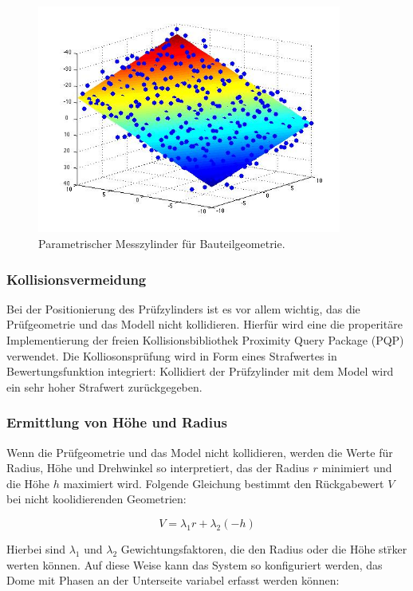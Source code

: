\begin{figure}[ht]
\centering
\includegraphics[width=10cm]{graphics/planefit.jpg}
\caption{Parametrischer Messzylinder f\"ur Bauteilgeometrie.}
\label{im:messlehre}
\end{figure}

\subsubsection{Kollisionsvermeidung}

Bei der Positionierung des Pr\"ufzylinders ist es vor allem wichtig, das die Pr\"ufgeometrie und das Modell nicht kollidieren. Hierf\"ur wird eine die properit\"are Implementierung der freien Kollisionsbibliothek Proximity Query Package (PQP) verwendet. Die Kolliosonspr\"ufung wird in Form eines Strafwertes in Bewertungsfunktion integriert: Kollidiert der Pr\"ufzylinder mit dem Model wird ein sehr hoher Strafwert zur\"uckgegeben.

\subsubsection{Ermittlung von H\"ohe und Radius}

Wenn die Pr\"ufgeometrie und das Model nicht kollidieren, werden die Werte f\"ur Radius, H\"ohe und Drehwinkel so interpretiert, das der Radius ${r}$ minimiert und die H\"ohe ${h}$ maximiert wird. Folgende Gleichung bestimmt den R\"uckgabewert ${V}$ bei nicht koolidierenden Geometrien:

\begin{equation}
{V=\lambda_{1}{r} + \lambda_{2}({-h})}
\end{equation}

Hierbei sind $\lambda_{1}$ und $\lambda_{2}$ Gewichtungsfaktoren, die  den Radius oder die H\"ohe st\"rker werten k\"onnen. Auf diese Weise kann das System so konfiguriert werden, das Dome mit Phasen an der Unterseite variabel erfasst werden k\"onnen: 

